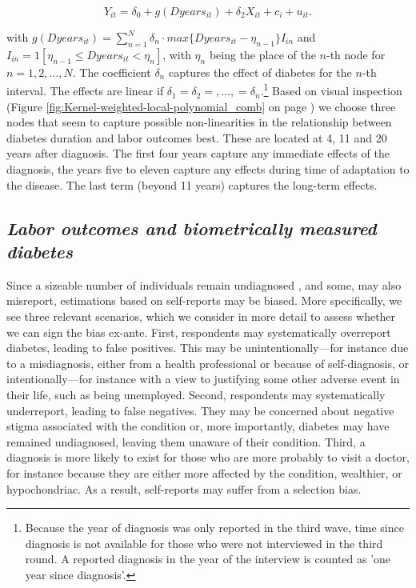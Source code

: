 \documentclass[12pt,english]{article}
\begin{document}
\begin{equation}
Y_{it}=\delta_{0}+g(Dyears_{it})+\delta_{2}X_{it}+c_{i}+u_{it}.\label{eq:splines}
\end{equation}

\noindent with $g(Dyears_{it})=\sum_{n=1}^{N}\delta_{n}\cdot max\{Dyears_{it}-\eta_{n-1}\}I_{in}$ and $I_{in}=1[\eta_{n-1}\leq Dyears_{it}<\eta_{n}]$, with $\eta_{n}$ being the place of the $n$-th node for $n=1,2,\ldots,N$. The coefficient $\delta_{n}$ captures the effect of diabetes for the $n$-th interval. The effects are linear if $\delta_{1}=\delta_{2}=,\ldots,=\delta_{n}$.\footnote{Because the year of diagnosis was only reported in the third wave, time since diagnosis is not available for those who were not interviewed in the third round.  A reported diagnosis in the year of the interview is counted as 'one year since diagnosis'.} Based on visual inspection (Figure \ref{fig:Kernel-weighted-local-polynomial_comb} on page \pageref{fig:Kernel-weighted-local-polynomial_comb}) we choose three nodes that seem to capture possible non-linearities in the relationship between diabetes duration and labor outcomes best. These are located at 4, 11 and 20 years after diagnosis. The first four years capture any immediate effects of the diagnosis, the years five to eleven capture any effects during time of adaptation to the disease. The last term (beyond 11 years) captures the long-term effects.

\subsection{\label{sec:Biomarker Strategy}\textit{Labor outcomes and biometrically measured diabetes}}

Since a sizeable number of individuals remain undiagnosed , and some, may also misreport, estimations based on self-reports may be biased. More specifically, we see three relevant scenarios, which we consider in more detail to assess whether we can sign the bias ex-ante. First, respondents may systematically overreport diabetes, leading to false positives. This may be unintentionally---for instance due to a misdiagnosis, either from a health professional or because of self-diagnosis, or intentionally---for instance with a view to justifying some other adverse event in their life, such as being unemployed. Second, respondents may systematically underreport, leading to false negatives. They may be concerned about negative stigma associated with the condition or, more importantly, diabetes may have remained undiagnosed, leaving them unaware of their condition. Third, a diagnosis is more likely to exist for those who are more probably to visit a doctor, for instance because they are either more affected by the condition, wealthier, or hypochondriac. As a result, self-reports may suffer from a selection bias.
\end{document}
